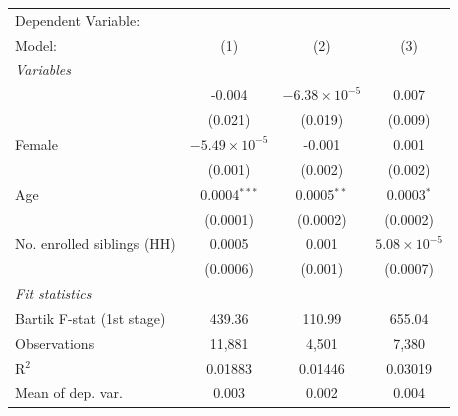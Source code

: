 \begin{tabular}{lccc}
   \tabularnewline \midrule \midrule
   Dependent Variable: & \\
   Model:                                                                & (1)                    & (2)                    & (3)\\  
   \midrule
   \emph{Variables}\\
        & -0.004                 & $-6.38\times 10^{-5}$  & 0.007\\   
                                                                         & (0.021)                & (0.019)                & (0.009)\\   
   Female                                                                & $-5.49\times 10^{-5}$  & -0.001                 & 0.001\\   
                                                                         & (0.001)                & (0.002)                & (0.002)\\   
   Age                                                                   & 0.0004$^{***}$         & 0.0005$^{**}$          & 0.0003$^{*}$\\   
                                                                         & (0.0001)               & (0.0002)               & (0.0002)\\   
   No. enrolled siblings (HH)                                            & 0.0005                 & 0.001                  & $5.08\times 10^{-5}$\\    
                                                                         & (0.0006)               & (0.001)                & (0.0007)\\   
   \midrule
   \emph{Fit statistics}\\
   Bartik F-stat (1st stage)                                     & 439.36                 & 110.99                 & 655.04\\  
   Observations                                                          & 11,881                 & 4,501                  & 7,380\\  
   R$^2$                                                                 & 0.01883                & 0.01446                & 0.03019\\  
   Mean of dep. var.                                                     & 0.003                  & 0.002                  & 0.004\\  
\bottomrule
\end{tabular}
